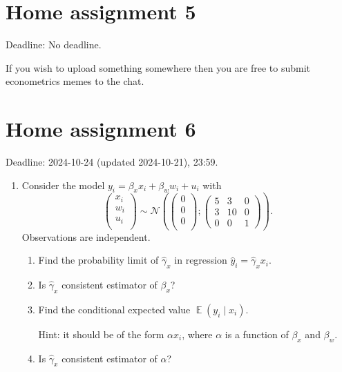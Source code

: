 \documentclass[12pt]{article}
\DeclareMathOperator{\E}{\mathbb{E}}
\newcommand \cN{\mathcal{N}}
\begin{document}
\section*{Home assignment 5}

Deadline: No deadline. 

If you wish to upload something somewhere then you are free to submit econometrics memes to the chat. 


\section*{Home assignment 6}

Deadline: 2024-10-24 (updated 2024-10-21), 23:59.

\begin{enumerate}
    \item Consider the model $y_i = \beta_x x_i + \beta_w w_i + u_i$ with
    \[
    \begin{pmatrix}
        x_i \\
        w_i \\
        u_i \\
    \end{pmatrix} \sim \cN\left(
        \begin{pmatrix}
            0 \\
            0 \\
            0 \\
        \end{pmatrix};
    \begin{pmatrix}
        5 & 3 & 0 \\
        3 & 10 & 0 \\
        0 & 0 & 1
    \end{pmatrix}
    \right).
    \]
    Observations are independent. 
    \begin{enumerate}
        \item Find the probability limit of $\hat \gamma_x$ in regression $\hat y_i = \hat \gamma_x x_i$.
        \item Is $\hat \gamma_x$ consistent estimator of $\beta_x$?
        \item Find the conditional expected value $\E(y_i \mid x_i)$.
        
        Hint: it should be of the form $\alpha x_i$, where $\alpha$ is a function of $\beta_x$ and $\beta_w$.
        \item Is $\hat \gamma_x$ consistent estimator of $\alpha$? 
    \end{enumerate}


\end{enumerate}
\end{document}
